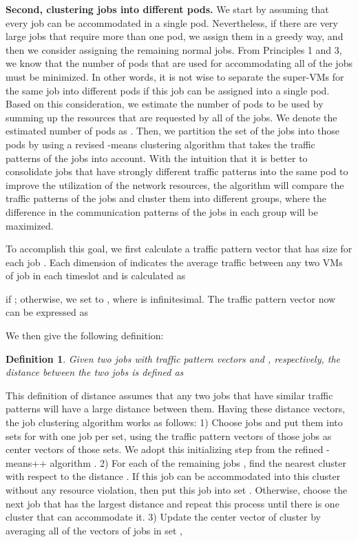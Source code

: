 \documentclass[journal,single-space,two column,twoside,10pt]{IEEEtran}
\newtheorem{definition}{Definition}
\begin{document}
\textbf{Second, clustering jobs into different pods.} We start by assuming that every job can be accommodated in a single pod. Nevertheless, if there are very large jobs that require more than one pod, we assign them in a greedy way, and then we consider assigning the remaining normal jobs. From Principles 1 and 3, we know that the number of pods that are used for accommodating all of the jobs must be minimized. In other words, it is not wise to separate the super-VMs for the same job into different pods if this job can be assigned into a single pod. Based on this consideration, we estimate the number of pods to be used by summing up the resources that are requested by all of the jobs. We denote the estimated number of pods as . Then, we partition the set of the jobs into those  pods by using a revised -means clustering algorithm that takes the traffic patterns of the jobs into account. With the intuition that it is better to consolidate jobs that have strongly different traffic patterns into the same pod to improve the utilization of the network resources, the algorithm will compare the traffic patterns of the jobs and cluster them into different groups, where the difference in the communication patterns of the jobs in each group will be maximized.

To accomplish this goal, we first calculate a traffic pattern vector  that has size  for each job . Each dimension of  indicates the average traffic between any two VMs of job  in each timeslot and is calculated as

if ; otherwise, we set  to , where  is infinitesimal. The traffic pattern vector now can be expressed as

We then give the following definition:
\begin{definition}
Given two jobs  with traffic pattern vectors  and , respectively, the distance between the two jobs is defined as

\end{definition}
This definition of distance assumes that any two jobs that have similar traffic patterns will have a large distance between them. Having these distance vectors, the job clustering algorithm works as follows: 1) Choose  jobs and put them into sets  for  with one job per set, using the traffic pattern vectors of those jobs as center vectors  of those sets. We adopt this initializing step from the refined -means++ algorithm \cite{Arthur_Vassilvitskii-2007}. 2) For each of the remaining jobs , find the nearest cluster  with respect to the distance . If this job can be accommodated into this cluster without any resource violation, then put this job into set . Otherwise, choose the next job that has the largest distance and repeat this process until there is one cluster that can accommodate it. 3) Update the center vector of cluster  by averaging all of the vectors of jobs in set ,
\end{document}
